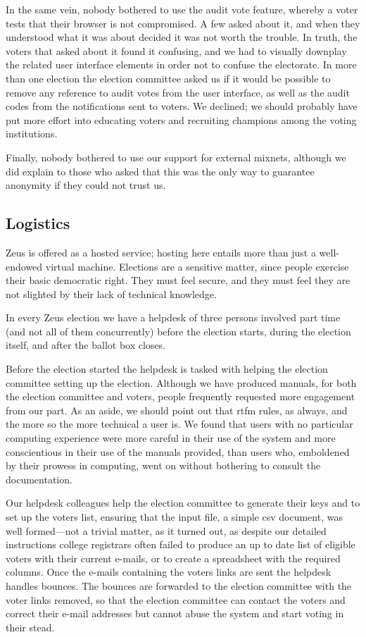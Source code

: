\documentclass[letterpaper,10pt]{article}
\begin{document}
In the same vein, nobody bothered to use the audit vote feature,
whereby a voter tests that their browser is not compromised. A few
asked about it, and when they understood what it was about decided it
was not worth the trouble. In truth, the voters that asked about it
found it confusing, and we had to visually downplay the related user
interface elements in order not to confuse the electorate. In more
than one election the election committee asked us if it would be
possible to remove any reference to audit votes from the user
interface, as well as the audit codes from the notifications sent to
voters. We declined; we should probably have put more effort into
educating voters and recruiting champions among the voting
institutions. 

Finally, nobody bothered to use our support for external mixnets,
although we did explain to those who asked that this was the only way
to guarantee anonymity if they could not trust us.

\subsection{Logistics}
\label{ssec:logistics}

Zeus is offered as a hosted service; hosting here entails more than
just a well-endowed virtual machine. Elections are a sensitive matter,
since people exercise their basic democratic right. They must feel
secure, and they must feel they are not slighted by their lack of
technical knowledge.

In every Zeus election we have a helpdesk of three persons involved
part time (and not all of them concurrently) before the election
starts, during the election itself, and after the ballot box closes.

Before the election started the helpdesk is tasked with helping the
election committee setting up the election. Although we have produced
manuals, for both the election committee and voters, people frequently
requested more engagement from our part. As an aside, we should point
out that {\sc rtfm} rules, as always, and the more so the more
technical a user is. We found that users with no particular computing
experience were more careful in their use of the system and more
conscientious in their use of the manuals provided, than users who,
emboldened by their prowess in computing, went on without bothering to
consult the documentation.

Our helpdesk colleagues help the election committee to generate
their keys and to set up the voters list, ensuring that the input
file, a simple {\sc csv} document, was well formed---not a trivial
matter, as it turned out, as despite our detailed instructions college
registrars often failed to produce an up to date list of eligible
voters with their current e-mails, or to create a spreadsheet with the
required columns. Once the e-mails containing the
voters links are sent the helpdesk handles bounces. The bounces
are forwarded to the election committee with the voter links removed,
so that the election committee can contact the voters and correct
their e-mail addresses but cannot abuse the system and start voting in
their stead. 
\end{document}
